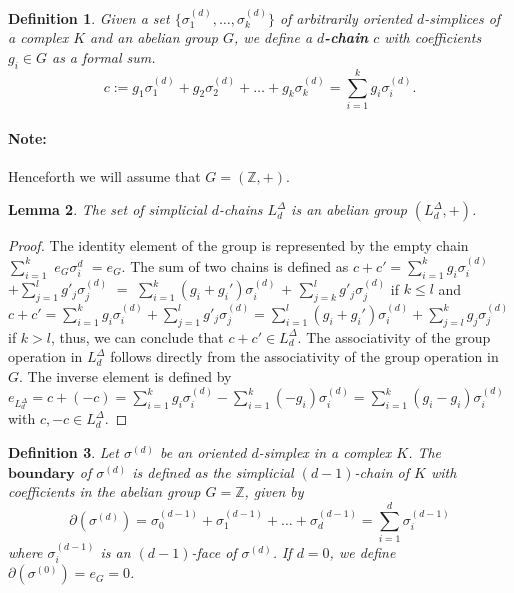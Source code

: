 \documentclass{amsart}
\newtheorem{definition}{Definition}[section]
\newtheorem{lemma}[definition]{Lemma}
\begin{document}
\begin{definition}
Given a set $\{\sigma_1^{(d)}, \ldots, \sigma_k^{(d)}\}$ of arbitrarily oriented $d$-simplices of a complex $K$ and an abelian group $G$, we define a \textbf{$d$-chain} $c$ with coefficients $g_i \in G$ as a formal sum.
\begin{equation}
c := g_1 \sigma^{(d)}_1 + g_2 \sigma^{(d)}_2 + \ldots + g_k \sigma^{(d)}_k = \sum_{i=1}^{k} g_i \sigma^{(d)}_i.
\end{equation}
\end{definition}

\paragraph{Note:} Henceforth we will assume that $G = (\mathbb{Z},+)$.

\begin{lemma}
The set of simplicial $d$-chains $L^\Delta_d$ is an abelian group $(L^\Delta_d,+)$.
\end{lemma}
\begin{proof}
The identity element of the group is represented by the empty chain $\sum_{i=1}^{k}$ $e_G \sigma^{d}_i$ $= e_G$. The sum of two chains is defined as $c+c' = \sum_{i=1}^{k} g_i \sigma_i^{(d)}$ $+ \sum_{j=1}^{l} g'_j \sigma_j^{(d)}$ $=$ $\sum_{i=1}^{k} (g_i+g_i') \sigma_i^{(d)}$ $+$ $\sum_{j=k}^{l} g'_j \sigma_j^{(d)}$ if $k \leq l$ and $c+c' = \sum_{i=1}^{k} g_i \sigma_i^{(d)} + \sum_{j=1}^{l} g'_j \sigma_j^{(d)} = \sum_{i=1}^{l} (g_i+g_i') \sigma_i^{(d)} + \sum_{j=l}^{k} g_j \sigma_j^{(d)}$ if $k > l$, thus, we can conclude that $c+c' \in L^\Delta_d$. The associativity of the group operation in $L^\Delta_d$ follows directly from the associativity of the group operation in $G$. The inverse element is defined by $e_{L^\Delta_d} = c + (-c) = \sum_{i=1}^{k} g_i \sigma_i^{(d)} - \sum_{i=1}^{k} (-g_i) \sigma_i^{(d)} = \sum_{i=1}^{k} (g_i-g_i) \sigma_i^{(d)}$ with $c,-c \in L^\Delta_d$.
\end{proof}

\begin{definition}
Let $\sigma^{(d)}$ be an oriented $d$-simplex in a complex $K$. The $\textbf{boundary}$ of $\sigma^{(d)}$ is defined as the simplicial $(d-1)$-chain of $K$ with coefficients in the abelian group $G = \mathbb{Z}$, given by
\begin{equation}
\partial(\sigma^{(d)}) = \sigma^{(d-1)}_0 + \sigma^{(d-1)}_1 + \ldots + \sigma^{(d-1)}_d = \sum_{i=1}^{d} \sigma^{(d-1)}_i
\end{equation}
where $\sigma^{(d-1)}_i$ is an $(d-1)$-face of $\sigma^{(d)}$. If $d=0$, we define $\partial(\sigma^{(0)}) = e_G = 0$.
\end{definition}
\end{document}

